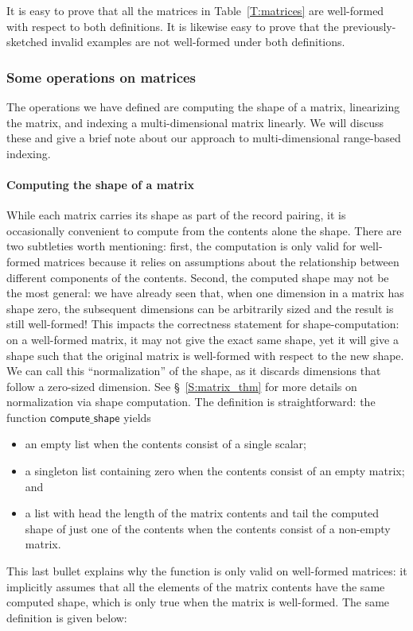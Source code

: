 \documentclass[11pt,conference]{IEEEtran}
\newcommand{\func}[1]{\mathsf{#1}}
\theoremstyle{plain} %
\theoremstyle{definition}
\theoremstyle{remark}
\begin{document}
It is easy to prove that all the matrices in Table~\ref{T:matrices} are
well-formed with respect to both definitions. It is likewise easy to prove that
the previously-sketched invalid examples are not well-formed under both
definitions.

\subsubsection{Some operations on matrices}

The operations we have defined are computing the shape of a matrix, linearizing
the matrix, and indexing a multi-dimensional matrix linearly. We will discuss
these and give a brief note about our approach to multi-dimensional range-based
indexing.

\paragraph{Computing the shape of a matrix} While each matrix carries its shape
as part of the record pairing, it is occasionally convenient to compute from the
contents alone the shape. There are two subtleties worth mentioning: first, the
computation is only valid for well-formed matrices because it relies on
assumptions about the relationship between different components of the contents.
Second, the computed shape may not be the most general: we have already seen
that, when one dimension in a matrix has shape zero, the subsequent dimensions
can be arbitrarily sized and the result is still well-formed! This impacts the
correctness statement for shape-computation: on a well-formed matrix, it may not
give the exact same shape, yet it will give a shape such that the original
matrix is well-formed with respect to the new shape. We can call this
``normalization'' of the shape, as it discards dimensions that follow a
zero-sized dimension. See \S~\ref{S:matrix_thm} for more details on
normalization via shape computation. The definition is straightforward: the
function \(\func{compute\_shape}\) yields
\begin{itemize}
    \item an empty list when the contents consist of a single scalar;
    \item a singleton list containing zero when the contents consist of an empty
        matrix; and
    \item a list with head the length of the matrix contents and tail the
        computed shape of just one of the contents when the contents
        consist of a non-empty matrix.
\end{itemize}
This last bullet explains why the function is only valid on well-formed
matrices: it implicitly assumes that all the elements of the matrix contents
have the same computed shape, which is only true when the matrix is well-formed.
The same definition is given below:
\end{document}
